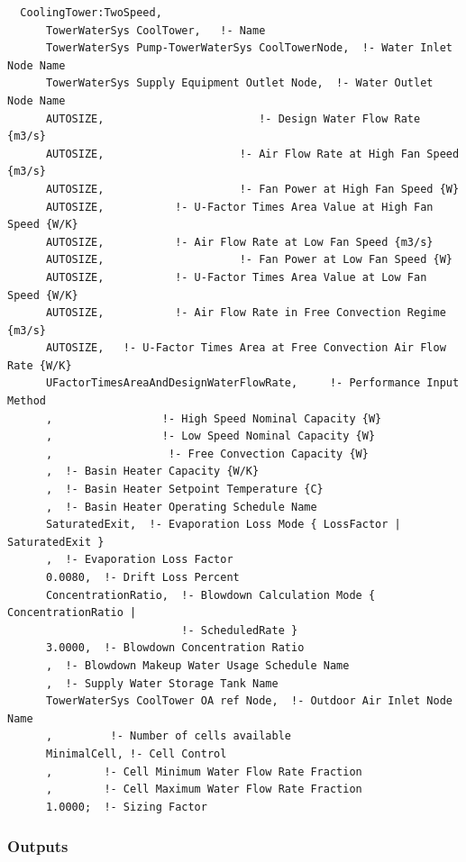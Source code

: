 \begin{lstlisting}
  CoolingTower:TwoSpeed,
      TowerWaterSys CoolTower,   !- Name
      TowerWaterSys Pump-TowerWaterSys CoolTowerNode,  !- Water Inlet Node Name
      TowerWaterSys Supply Equipment Outlet Node,  !- Water Outlet Node Name
      AUTOSIZE,                        !- Design Water Flow Rate {m3/s}
      AUTOSIZE,                     !- Air Flow Rate at High Fan Speed {m3/s}
      AUTOSIZE,                     !- Fan Power at High Fan Speed {W}
      AUTOSIZE,           !- U-Factor Times Area Value at High Fan Speed {W/K}
      AUTOSIZE,           !- Air Flow Rate at Low Fan Speed {m3/s}
      AUTOSIZE,                     !- Fan Power at Low Fan Speed {W}
      AUTOSIZE,           !- U-Factor Times Area Value at Low Fan Speed {W/K}
      AUTOSIZE,           !- Air Flow Rate in Free Convection Regime {m3/s}
      AUTOSIZE,   !- U-Factor Times Area at Free Convection Air Flow Rate {W/K}
      UFactorTimesAreaAndDesignWaterFlowRate,     !- Performance Input Method
      ,                 !- High Speed Nominal Capacity {W}
      ,                 !- Low Speed Nominal Capacity {W}
      ,                  !- Free Convection Capacity {W}
      ,  !- Basin Heater Capacity {W/K}
      ,  !- Basin Heater Setpoint Temperature {C}
      ,  !- Basin Heater Operating Schedule Name
      SaturatedExit,  !- Evaporation Loss Mode { LossFactor | SaturatedExit }
      ,  !- Evaporation Loss Factor
      0.0080,  !- Drift Loss Percent
      ConcentrationRatio,  !- Blowdown Calculation Mode { ConcentrationRatio |
                           !- ScheduledRate }
      3.0000,  !- Blowdown Concentration Ratio
      ,  !- Blowdown Makeup Water Usage Schedule Name
      ,  !- Supply Water Storage Tank Name
      TowerWaterSys CoolTower OA ref Node,  !- Outdoor Air Inlet Node Name
      ,         !- Number of cells available
      MinimalCell, !- Cell Control
      ,        !- Cell Minimum Water Flow Rate Fraction
      ,        !- Cell Maximum Water Flow Rate Fraction
      1.0000;  !- Sizing Factor
\end{lstlisting}

\subsubsection{Outputs}\label{outputs-1-003}

